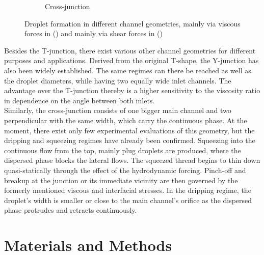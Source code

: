 \begin{figure}
\begin{subfigure}{0.49\linewidth}
		\caption{Cross-junction}
		\label{fig:fluidics:droplet:cross-junction}
	\end{subfigure}
	
	\caption{Droplet formation in different channel geometries, mainly via viscous forces in (\protect{}) and mainly via shear forces in (\protect {})}
	\label{fig:fluidics:droplet:junctions}
\end{figure}

Besides the T-junction, there exist various other channel geometries for different purposes and applications. Derived from the original T-shape, the Y-junction has also been widely established. The same regimes can there be reached as well as the droplet diameters, while having two equally wide inlet channels. The advantage over the T-junction thereby is a higher sensitivity to the viscosity ratio in dependence on the angle between both inlets.\cite{lit:fluidic:microfluidics_review}\\
Similarly, the cross-junction consists of one bigger main channel and two perpendicular with the same width, which carry the continuous phase. At the moment, there exist only few experimental evaluations of this geometry, but the dripping and squeezing regimes have already been confirmed. Squeezing into the continuous flow from the top, mainly plug droplets are produced, where the dispersed phase blocks the lateral flows. The squeezed thread begins to thin down quasi-statically through
the effect of the hydrodynamic forcing.\cite{lit:fluidics:droplet:dynamics} Pinch-off and breakup at the junction or its immediate vicinity are then governed by the formerly mentioned viscous and interfacial stresses. In the dripping regime, the droplet's width is smaller or close to the main channel's orifice as the dispersed phase protrudes and retracts continuously.\cite{lit:fluidics:droplet:formation:cross:squeezing}
\clearpage
\newpage\null\thispagestyle{empty}\newpage
\chapter{Materials and Methods}
